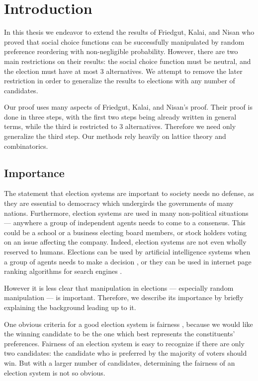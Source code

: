 

\chapter{Introduction}

	In this thesis we endeavor to extend the results of Friedgut, Kalai, and Nisan \cite{friedgut2008elections} who proved that social choice functions can be successfully manipulated by random preference reordering with non-negligible probability. However, there are two main restrictions on their results: the social choice function must be neutral, and the election must have at most 3 alternatives. We attempt to remove the later restriction in order to generalize the results to elections with any number of candidates.

	Our proof uses many aspects of Friedgut, Kalai, and Nisan's proof. Their proof is done in three steps, with the first two steps being already written in general terms, while the third is restricted to 3 alternatives. Therefore we need only generalize the third step. Our methods rely heavily on lattice theory and combinatorics.


\section{Importance}

	The statement that election systems are important to society needs no defense, as they are essential to democracy which undergirds the governments of many nations. Furthermore, election systems are used in many non-political situations --- anywhere a group of independent agents needs to come to a consensus. This could be a school or a business electing board members, or stock holders voting on an issue affecting the company. Indeed, election systems are not even wholly reserved to humans. Elections can be used by artificial intelligence systems when a group of agents needs to make a decision \cite{ephrati1991clarke, ephrati1993multi, pennock2000social, dwork2001rank, fagin2003efficient}, or they can be used in internet page ranking algorithms for search engines \cite{chevaleyre2007short}.

	However it is less clear that manipulation in elections --- especially random manipulation --- is important. Therefore, we describe its importance by briefly explaining the background leading up to it.

	One obvious criteria for a good election system is fairness \cite{chevaleyre2006issues}, because we would like the winning candidate to be the one which best represents the constituents' preferences. Fairness of an election system is easy to recognize if there are only two candidates: the candidate who is preferred by the majority of voters should win. But with a larger number of candidates, determining the fairness of an election system is not so obvious.

